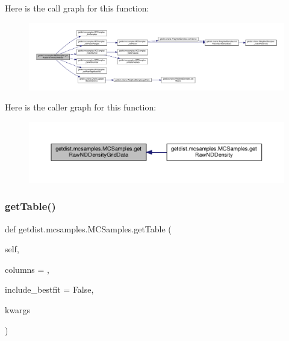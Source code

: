 Here is the call graph for this function\+:
\nopagebreak
\begin{figure}[H]
\begin{center}
\leavevmode
\includegraphics[width=350pt]{classgetdist_1_1mcsamples_1_1MCSamples_a8a54d102a9c5428e83651b3585f0e148_cgraph}
\end{center}
\end{figure}
Here is the caller graph for this function\+:
\nopagebreak
\begin{figure}[H]
\begin{center}
\leavevmode
\includegraphics[width=350pt]{classgetdist_1_1mcsamples_1_1MCSamples_a8a54d102a9c5428e83651b3585f0e148_icgraph}
\end{center}
\end{figure}
\mbox{\label{classgetdist_1_1mcsamples_1_1MCSamples_a2faa89318b77f8c9a09eec976272f54c}} 
\subsubsection{\texorpdfstring{get\+Table()}{getTable()}}
{\footnotesize\ttfamily def getdist.\+mcsamples.\+M\+C\+Samples.\+get\+Table (\begin{DoxyParamCaption}\item[{}]{self,  }\item[{}]{columns = {},  }\item[{}]{include\+\_\+bestfit = {\ttfamily False},  }\item[{}]{kwargs }\end{DoxyParamCaption})}


